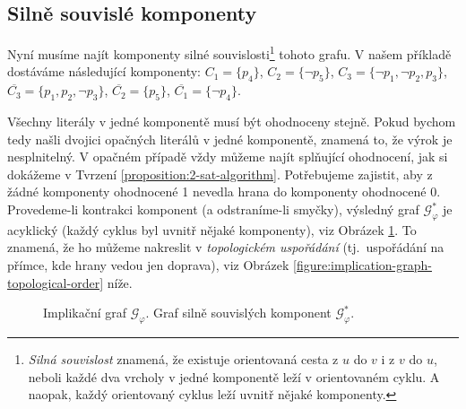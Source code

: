 \subsection{Silně souvislé komponenty}

Nyní musíme najít komponenty silné souvislosti\footnote{\emph{Silná souvislost} znamená, že existuje orientovaná cesta z $u$ do $v$ i z $v$ do $u$, neboli každé dva vrcholy v jedné komponentě leží v orientovaném cyklu. A naopak, každý orientovaný cyklus leží uvnitř nějaké komponenty.} tohoto grafu. V našem příkladě dostáváme následující komponenty: $C_1=\{p_4\}$, $C_2=\{\neg p_5\}$, $C_3=\{\neg p_1,\neg p_2,p_3\}$, $\overline{C_3}=\{p_1,p_2,\neg p_3\}$, $\overline{C_2}=\{p_5\}$, $\overline{C_1}=\{\neg p_4\}$.

Všechny literály v jedné komponentě musí být ohodnoceny stejně. Pokud bychom tedy našli dvojici opačných literálů v jedné komponentě, znamená to, že výrok je nesplnitelný. V opačném případě vždy můžeme najít splňující ohodnocení, jak si dokážeme v Tvrzení \ref{proposition:2-sat-algorithm}. Potřebujeme zajistit, aby z žádné komponenty ohodnocené 1 nevedla hrana do komponenty ohodnocené 0. Provedeme-li kontrakci komponent (a odstraníme-li smyčky), výsledný graf $\mathcal G_\varphi^\ast$ je acyklický (každý cyklus byl uvnitř nějaké komponenty), viz Obrázek \ref{figure:implication-graph-components}. To znamená, že ho můžeme nakreslit v \emph{topologickém uspořádání} (tj.\ uspořádání na přímce, kde hrany vedou jen doprava), viz Obrázek \ref{figure:implication-graph-topological-order} níže. 

\begin{figure} 
    \small   
    \centering
        \caption{Implikační graf $\mathcal G_\varphi$. Graf silně souvislých komponent $\mathcal G_\varphi^\ast$.}\label{figure:implication-graph-components}
\end{figure}

